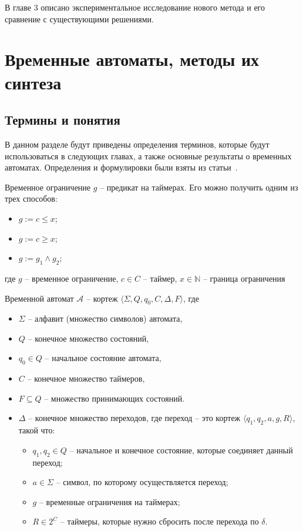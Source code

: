 \documentclass[times,specification,annotation]{itmo-student-thesis}
\begin{document}
В главе 3 описано экспериментальное исследование нового метода и его сравнение с существующими решениями.

\chapter{Временные автоматы, методы их синтеза}
\startrelatedwork

\section{Термины и понятия}
В данном разделе будут приведены определения терминов, которые будут использоваться в следующих главах, а также основные результаты о временных автоматах.
Определения и формулировки были взяты из статьи~\cite{1-dta}.

\begin{definition}
  Временное ограничение $g$ -- предикат на таймерах. Его можно получить одним из трех способов:
  \begin{itemize}
    \item $g := c \leq x$;
    \item $g := c \geq x$;
    \item $g := g_1 \land g_2$;
  \end{itemize}
  где $g$ -- временное ограничение, $c \in C$ -- таймер, $x \in \mathbb{N}$ -- граница ограничения
\end{definition}

\begin{definition}
  Временной автомат $\mathcal{A}$ -- кортеж $\langle \Sigma, Q, q_0, C, \Delta, F \rangle$, где
  \begin{itemize}
    \item $\Sigma$ -- алфавит (множество символов) автомата,
    \item $Q$ -- конечное множество состояний,
    \item $q_0 \in Q$ -- начальное состояние автомата,
    \item $C$ -- конечное множество таймеров,
    \item $F \subseteq Q$ -- множество принимающих состояний.
    \item $\Delta$ -- конечное множество переходов, где переход -- это кортеж $\langle q_1, q_2, a, g, R \rangle$, такой что:
    \begin{itemize}
      \item $q_1, q_2 \in Q$ -- начальное и конечное состояние, которые соединяет данный переход;
      \item $a \in \Sigma$ -- символ, по которому осуществляется переход;
      \item $g$ -- временные ограничения на таймерах;
      \item $R \in 2^{C}$ -- таймеры, которые нужно сбросить после перехода по $\delta$. 
    \end{itemize}
  \end{itemize}
  \label{timed-automaton}
\end{definition}
\end{document}
